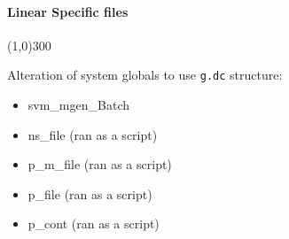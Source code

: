 \documentclass[12pt]{article}
\begin{document}
	\begin{comment}
	Files that were altered:
	dc_cont
	dc_cur
	dc_indx
	dc_lf
	dc_line
	dc_load
	dc_sim
	dc_vidc
	handleNewGlobals
	inv_lf
	i_simu
	lfdcs
	nc_load
	rec_lf
	red_ybus
	s_simu_Batch
	\end{comment}

\pagebreak
\paragraph{Linear Specific files}\line(1,0){300}

Alteration of system globals to use \verb|g.dc| structure:

	\begin{itemize}
		\item svm\_mgen\_Batch
		\item ns\_file (ran as a script)
		\item p\_m\_file (ran as a script)
		\item p\_file (ran as a script)
		\item p\_cont (ran as a script)
	\end{itemize}
	
	
\end{document}

